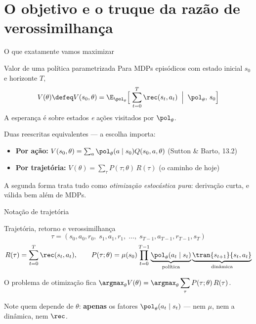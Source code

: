 \documentclass[aspectratio=169, 11pt]{beamer}
\newcommand{\thv}{\theta}                       %
\newcommand{\polth}{\pol_{\thv}}                %
\newcommand{\traj}{\tau}                        %
\newcommand{\Rtraj}{R(\traj)}
\newcommand{\Ptraj}{P(\traj;\thv)}
\begin{document}
\section{O objetivo e o truque da razão de verossimilhança}

\begin{frame}{O que exatamente vamos maximizar}

  \begin{defbox}{Valor de uma política parametrizada}
    Para MDPs episódicos com estado inicial $s_0$ e horizonte $T$,
    \[
      V(\thv) \defeq V(s_0,\thv)
      = \E_{\polth}\Bigl[\; \sum_{t=0}^{T} \rec(s_t,a_t) \;\Bigm|\; \polth,\, s_0 \Bigr]
    \]
    \vspace{-0.6em}
    A esperança é sobre estados \emph{e} ações visitados por $\polth$.
  \end{defbox}

  Duas reescritas equivalentes --- a escolha importa:
  \begin{itemize}\setlength{\itemsep}{0.2ex}
    \item \textbf{Por ação:} $V(s_0,\thv) = \sum_a \polth(a\mid s_0) Q(s_0,a,\thv)$
      \hfill{\scriptsize (Sutton \& Barto, 13.2)}
    \item \textbf{Por trajetória:} $V(\thv) = \sum_{\traj} \Ptraj\, \Rtraj$
      \hfill{\scriptsize (o caminho de hoje)}
  \end{itemize}
  \vspace{-0.3em}

  \vspace{-0.6em}
  \begin{ideiabox}
    A segunda forma trata tudo como \emph{otimização estocástica pura}:
    derivação curta, e válida bem além de MDPs.
  \end{ideiabox}
\end{frame}

\begin{frame}{Notação de trajetória}

  \begin{defbox}{Trajetória, retorno e verossimilhança}
    \[
      \traj = (s_0,a_0,r_0,\; s_1,a_1,r_1,\; \dots,\; s_{T-1},a_{T-1},r_{T-1},s_T)
    \]
    \[
      \Rtraj = \sum_{t=0}^{T} \rec(s_t,a_t),
      \qquad
      \Ptraj = \mu(s_0) \prod_{t=0}^{T-1}
        \underbrace{\polth(a_t\mid s_t)}_{\text{política}}
        \underbrace{\tran{s_{t+1}}{s_t,a_t}}_{\text{dinâmica}}
    \]
  \end{defbox}

  O problema de otimização fica
  $\displaystyle \argmax_{\thv} V(\thv) = \argmax_{\thv} \sum_{\traj} \Ptraj\, \Rtraj$.
  \smallskip

  \begin{alertabox}
    Note quem depende de $\thv$: \textbf{apenas} os fatores
    $\polth(a_t\mid s_t)$ --- nem $\mu$, nem a dinâmica, nem $\rec$.
  \end{alertabox}
\end{frame}
\end{document}
